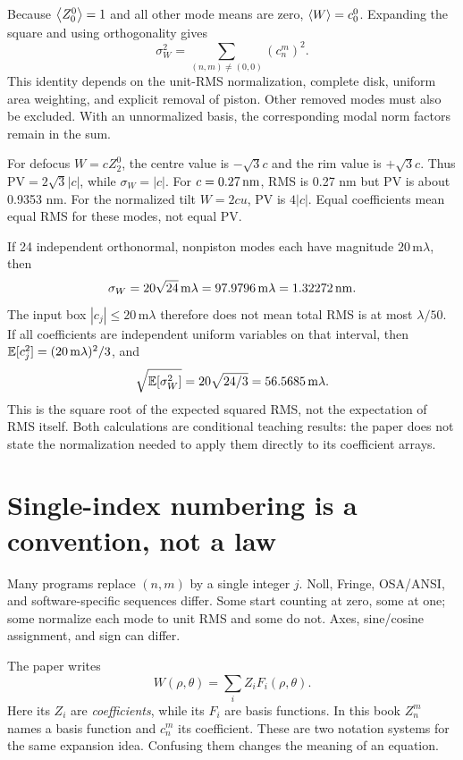 Because $\left\langle Z_0^0\right\rangle=1$ and all other mode means are zero,
$\left\langle W\right\rangle=c_0^0$. Expanding the square and using orthogonality gives
\begin{equation}
\sigma_W^2=\sum_{(n,m)\ne(0,0)}(c_n^m)^2.
\label{eq:rss}
\end{equation}
This identity depends on the unit-RMS normalization, complete disk,
uniform area weighting, and explicit removal of piston.
Other removed modes must also be excluded. With an unnormalized
basis, the corresponding modal norm factors remain in the sum.

For defocus $W=cZ_2^0$, the centre value is $-\sqrt3c$ and the rim value
is $+\sqrt3c$. Thus
$\mathrm{PV}=2\sqrt3|c|$, while $\sigma_W=|c|$.
For $c=0.27\,\mathrm{nm}$, RMS is 0.27 nm but PV is about 0.9353 nm.
For the normalized tilt $W=2cu$, PV is $4|c|$.
Equal coefficients mean equal RMS for these modes, not equal PV.

If 24 independent orthonormal, nonpiston modes each have magnitude
$20\,\mathrm{m}\lambda$, then
\[
\sigma_W=20\sqrt{24}\,\mathrm{m}\lambda
=97.9796\,\mathrm{m}\lambda=1.32272\,\mathrm{nm}.
\]
The input box $|c_j|\leq20\,\mathrm{m}\lambda$ therefore does not mean
total RMS is at most $\lambda/50$. If all coefficients are independent
uniform variables on that interval, then
$\mathbb{E}[c_j^2]=(20\,\mathrm{m}\lambda)^2/3$, and
\[
\sqrt{\mathbb{E}[\sigma_W^2]}=20\sqrt{24/3}
=56.5685\,\mathrm{m}\lambda.
\]
This is the square root of the expected squared RMS, not the expectation
of RMS itself. Both calculations are conditional teaching results:
the paper does not state the normalization needed to apply them directly
to its coefficient arrays.

\section{Single-index numbering is a convention, not a law}
Many programs replace $(n,m)$ by a single integer $j$.
Noll, Fringe, OSA/ANSI, and software-specific sequences differ.
Some start counting at zero, some at one; some normalize each mode to
unit RMS and some do not. Axes, sine/cosine assignment, and sign can differ.

The paper writes
\[
W(\rho,\theta)=\sum_i Z_iF_i(\rho,\theta).
\]
Here its $Z_i$ are \emph{coefficients}, while its $F_i$ are basis
functions. In this book $Z_n^m$ names a basis function and $c_n^m$ its
coefficient. These are two notation systems for the same expansion idea.
Confusing them changes the meaning of an equation.

